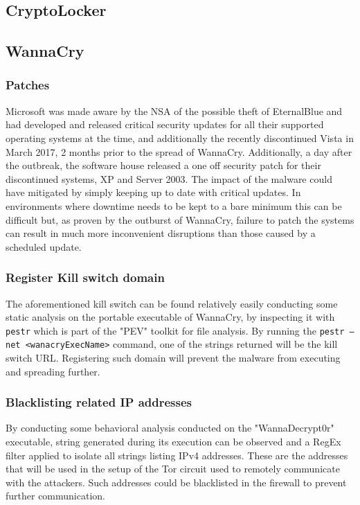 \documentclass[10pt,a4paper]{article}
\begin{document}
\subsection{CryptoLocker}

\subsection{WannaCry}

\subsubsection{Patches}
Microsoft was made aware by the NSA of the possible theft of EternalBlue and had developed and released critical security updates for all their supported operating systems at the time, and additionally the recently discontinued Vista in March 2017, 2 months prior to the spread of WannaCry.
Additionally, a day after the outbreak, the software house released a one off security patch for their discontinued systems, XP and Server 2003.
The impact of the malware could have mitigated by simply keeping up to date with critical updates. In environments where downtime needs to be kept to a bare minimum this can be difficult but, as proven by the outburst of WannaCry, failure to patch the systems can result in much more inconvenient disruptions than those caused by a scheduled update.

\subsubsection{Register Kill switch domain}
The aforementioned kill switch can be found relatively easily conducting some static analysis on the portable executable of WannaCry, by inspecting it with \texttt{pestr} which is part of the "PEV" toolkit for file analysis. By running the \texttt{pestr --net <wanacryExecName>} command, one of the strings returned will be the kill switch URL. Registering such domain will prevent the malware from executing and spreading further.

\subsubsection{Blacklisting related IP addresses}
By conducting some behavioral analysis conducted on the "WannaDecrypt0r" executable, string generated during its execution can be observed and a RegEx filter applied to isolate all strings listing IPv4 addresses. These are the addresses that will be used in the setup of the Tor circuit used to remotely communicate with the attackers. Such addresses could be blacklisted in the firewall to prevent further communication.
\end{document}
